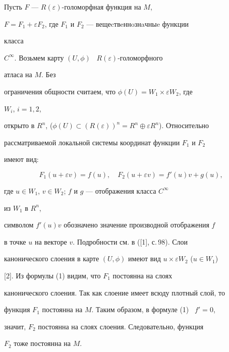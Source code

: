 \begin{pf} 


Пусть $F$ --- $R(\varepsilon)$-голоморфная функция на $M$, 


$F=F_1+\varepsilon F_2$, где $F_1$ и $F_2$ --- вещеcтвeннoзнaчныe функции 


класса 


$C^\infty$. Возьмем карту $(U,\phi)$ \ $R(\varepsilon)$-голоморфного 


атласа на $M$. Без 


ограничения общности считаем, что $\phi(U)=W_1\times\varepsilon W_2$, где 


$W_i$, $i=1,2$, 


открыто в $R^n$, ($\phi(U)\subset 


(R(\varepsilon))^n=R^n\oplus\varepsilon R^n$). Относительно 


рассматриваемой локальной системы координат функции $F_1$ и $F_2$ 


имеют вид: 


\begin{equation} 


F_1(u+\varepsilon v)=f(u),\quad 


F_2(u+\varepsilon v)=f'(u)v+g(u), 


\end{equation} 


где $u\in W_1$, $v\in W_2$; $f$ и $g$ --- отображения класса $C^\infty$ 


из $W_1$ в $R^n$, 


символом $f'(u)v$ обозначено значение производной отображения $f$ 


в точке $u$ на векторе $v$. Подробности см. в ([1], с.\,98). Слои 


канонического слоения в карте $(U,\phi)$ имеют вид $u\times\varepsilon 


W_2$ ($u\in W_1$) 


[2]. Из формулы (1) видим, что $F_1$ постоянна на слоях 


канонического слоения. Так как слоение имеет всюду плотный слой, то 


функция $F_1$ постоянна на $M$. Таким образом, в формуле (1) \ $f'=0$, 


значит, $F_2$ постоянна на слоях слоения. Следовательно, функция 


$F_2$ тоже постоянна на $M$. 


\end{pf} 


